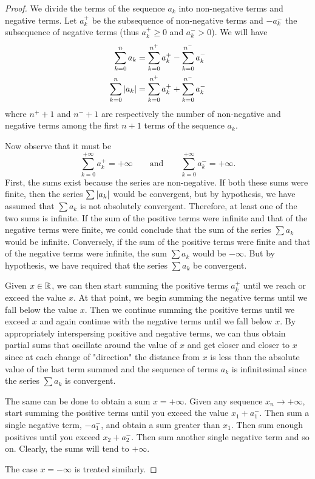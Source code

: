 \begin{proof}
We divide the terms of the sequence $a_k$ into non-negative terms
and negative terms. Let $a^+_k$ be the subsequence of non-negative terms
and $-a^-_k$ the subsequence
of negative terms (thus $a^+_k\ge 0$ and $a^-_k > 0$). We will have
\begin{align*}
  \sum_{k=0}^n a_k &= \sum_{k=0}^{n^+} a^+_k - \sum_{k=0}^{n^-} a^-_k \\
  \sum_{k=0}^n {\left|a_k\right|} &= \sum_{k=0}^{n^+} a^+_k + \sum_{k=0}^{n^-} a^-_k
\end{align*}
where $n^+ +1$ and $n^-+1$ are respectively
the number of non-negative and negative terms
among the first $n+1$ terms of the sequence $a_k$.

Now observe that it must be
\[
\sum_{k=0}^{+\infty} a_k^+ = +\infty \qquad \text{and} \qquad
\sum_{k=0}^{+\infty} a_k^- = +\infty.
\]
First, the sums exist because the series are non-negative.
If both these sums were finite, then the series $\sum{\left|a_k\right|}$ would be
convergent, but by hypothesis, we have assumed that $\sum a_k$ is not
absolutely convergent.
Therefore, at least one of the two sums is infinite. If the sum of the positive
terms
were infinite and that of the negative terms were finite, we could conclude that
the sum of the series $\sum a_k$ would be infinite.
Conversely, if the sum of the positive terms were finite and that of the
negative terms were infinite, the sum $\sum a_k$ would be $-\infty$. But by
hypothesis,
we have required that the series $\sum a_k$ be convergent.

Given $x\in {\mathbb R}$, we can then start summing the positive terms
$a^+_k$ until we reach or exceed the value $x$. At that point, we begin summing
the negative terms until we fall below the value $x$.
Then we continue summing the positive terms until we exceed $x$
and again continue with the negative terms until we fall below $x$. By
appropriately interspersing positive and negative terms,
we can thus obtain partial sums that oscillate around the value 
of $x$ and get closer and closer to $x$ since at each change of "direction" 
the distance from $x$ is less than the absolute value of the last term summed 
and the sequence of terms $a_k$ is infinitesimal since the series $\sum a_k$ is
convergent.

The same can be done to obtain a sum $x=+\infty$. Given any
sequence $x_n \to +\infty$, start summing the positive terms until you exceed
the value $x_1+a_1^-$.
Then sum a single negative term, $-a_1^-$, and obtain a sum greater than $x_1$. 
Then sum enough positives until you exceed $x_2+a_2^-$. 
Then sum another single negative term and so on. 
Clearly, the sums will tend to $+\infty$.

The case $x=-\infty$ is treated similarly.
\end{proof}
